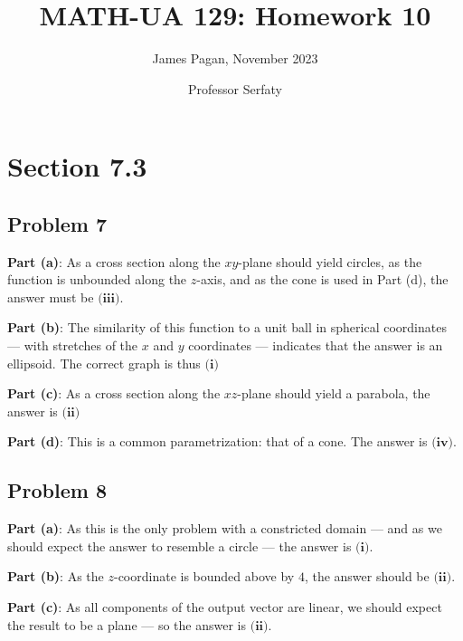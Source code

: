 \documentclass[11pt]{article}
\title{MATH-UA 129: Homework 10}
\author{James Pagan, November 2023}
\date{Professor Serfaty}
\begin{document}
\maketitle
\tableofcontents

\newpage


\section{Section 7.3}


\subsection*{Problem 7}

\textbf{Part (a)}: As a cross section along the $xy$-plane should yield circles, as the function is unbounded along the $z$-axis, and as the cone is used in Part (d), the answer must be $\boxed{\textbf{(iii)}}$.

\textbf{Part (b)}: The similarity of this function to a unit ball in spherical coordinates --- with stretches of the $x$ and $y$ coordinates --- indicates that the answer is an ellipsoid. The correct graph is thus $\boxed{\textbf{(i)}}$

\textbf{Part (c)}: As a cross section along the $xz$-plane should yield a parabola, the answer is $\boxed{\textbf{(ii)}}$

\textbf{Part (d)}: This is a common parametrization: that of a cone. The answer is $\boxed{\textbf{(iv)}}$.


\subsection*{Problem 8}

\textbf{Part (a)}: As this is the only problem with a constricted domain --- and as we should expect the answer to resemble a circle --- the answer is $\boxed{\textbf{(i)}}$.

\textbf{Part (b)}: As the $z$-coordinate is bounded above by $4$, the answer should be $\boxed{\textbf{(ii)}}$.

\textbf{Part (c)}: As all components of the output vector are linear, we should expect the result to be a plane --- so the answer is $\boxed{\textbf{(ii)}}$.
\end{document}
